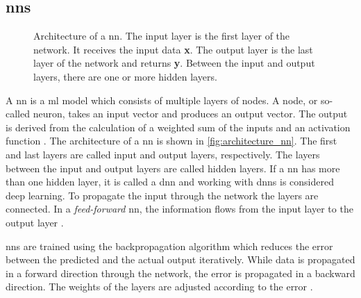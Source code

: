 \subsection{\aclp*{nn}}\label{sec:neural_network}

\begin{figure}[!htp] %
    \centering
    
    \caption[Architecture of a \acs*{nn}]
    {Architecture of a \acs*{nn}. 
    The input layer is the first layer of the network.
    It receives the input data \textbf{x}.
    The output layer is the last layer of the network and returns \textbf{y}.
    Between the input and output layers, there are one or more hidden layers.
    }
    \label{fig:architecture_nn}
\end{figure}

A \ac{nn} is a \ac{ml} model which consists of multiple layers of nodes.
A node, or so-called neuron, takes an input vector and produces an output vector.
The output is derived from the calculation of a weighted sum of the inputs and an activation function \cite{KI2022}.
The architecture of a \ac{nn} is shown in \autoref{fig:architecture_nn}.
The first and last layers are called input and output layers, respectively.
The layers between the input and output layers are called hidden layers.
If a \ac{nn} has more than one hidden layer, it is called a \ac{dnn} and working with \acp{dnn} is considered deep learning.
To propagate the input through the network the layers are connected.
In a \textit{feed-forward} \ac{nn}, the information flows from the input layer to the output layer \cite{seminar_ies}.

\acp{nn} are trained using the backpropagation algorithm which reduces the error between the predicted and the actual output iteratively.
While data is propagated in a forward direction through the network, the error is propagated in a backward direction.
The weights of the layers are adjusted according to the error \cite{KI2022}.

